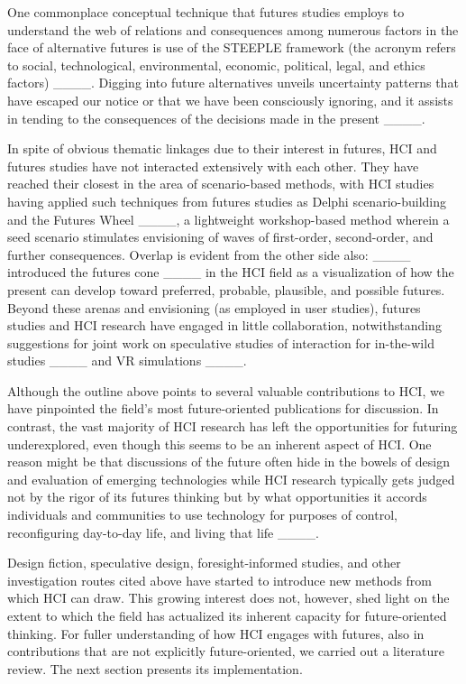 One commonplace conceptual technique that futures studies employs to understand the web of relations and consequences among numerous factors in the face of alternative futures is use of the STEEPLE framework (the acronym refers to social, technological, environmental, economic, political, legal, and ethics factors) ____. Digging into future alternatives unveils uncertainty patterns that have escaped our notice or that we have been consciously ignoring, and it assists in tending to the consequences of the decisions made in the present ____.

In spite of obvious thematic linkages due to their interest in futures, HCI and futures studies have not interacted extensively with each other. They have reached their closest in the area of scenario-based methods, with HCI studies having applied such techniques from futures studies as Delphi scenario-building \cite {mankoffLookingYesterdayTomorrow2013a} and the Futures Wheel ____, a lightweight workshop-based method wherein a seed scenario stimulates envisioning of waves of first-order, second-order, and further consequences. Overlap is evident from the other side also: ____ introduced the futures cone ____ in the HCI field as a visualization of how the present can develop toward preferred, probable, plausible, and possible futures. 
Beyond these arenas and envisioning (as employed in user studies), futures studies and HCI research have engaged in little collaboration, notwithstanding suggestions for joint work on speculative studies of interaction for in-the-wild studies ____ and VR simulations ____. 

Although the outline above points to several valuable contributions to HCI, we have pinpointed the field's most future-oriented publications for discussion. 
In contrast, the vast majority of HCI research has left the opportunities for futuring underexplored, even though this seems to be an inherent aspect of HCI. One reason might be that discussions of the future often hide in the bowels of design and evaluation of emerging technologies while HCI research typically gets judged not by the rigor of its futures thinking but by what opportunities it accords individuals and communities to use technology for purposes of control, reconfiguring day-to-day life, and living that life ____.

Design fiction, speculative design, foresight-informed studies, and other investigation routes cited above have started to introduce new methods from which HCI can draw. This growing interest does not, however, shed light on the extent to which the field has actualized its inherent capacity for future-oriented thinking. 
For fuller understanding of how HCI engages with futures, also in contributions that are not explicitly future-oriented, we carried out a literature review. The next section presents its implementation.